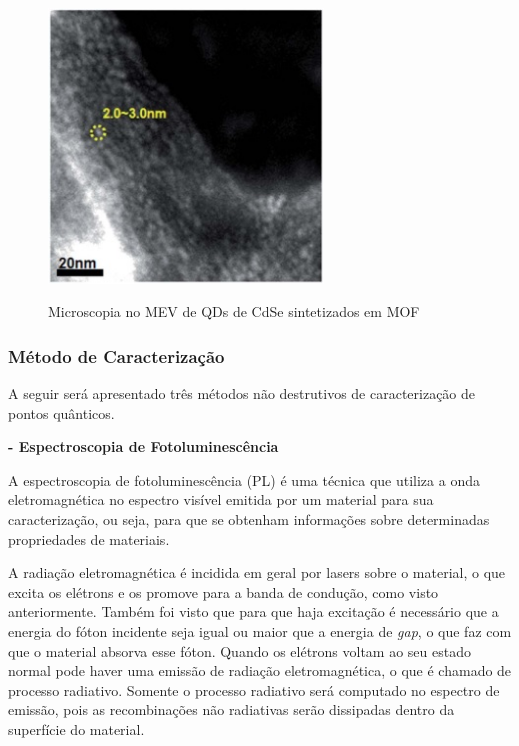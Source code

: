 	\begin{figure}[H]
	  \centering
	  \caption{Microscopia no MEV de QDs de CdSe sintetizados em MOF\cite{sintese3}}
	  \includegraphics[width=0.65\textwidth]{images/figura18.jpg}
	  \label{fig18}
	\end{figure}

\subsubsection{Método de Caracterização}

	\par A seguir será apresentado três métodos não destrutivos de caracterização de pontos quânticos.

	\par \textbf{- Espectroscopia de Fotoluminescência}

		\par A espectroscopia de fotoluminescência\cite{sintese4} (PL) é uma técnica que utiliza a onda eletromagnética no espectro visível emitida por um material para sua caracterização, ou seja, para que se obtenham informações sobre determinadas propriedades de materiais.

		\par A radiação eletromagnética é incidida em geral por lasers sobre o material, o que excita os elétrons e os promove para a banda de condução, como visto anteriormente. Também foi visto que para que haja excitação é necessário que a energia do fóton incidente seja igual ou maior que a energia de \textit{gap}, o que faz com que o material absorva esse fóton. Quando os elétrons voltam ao seu estado normal pode haver uma emissão de radiação eletromagnética, o que é chamado de processo radiativo. Somente o processo radiativo será computado no espectro de emissão, pois as recombinações não radiativas serão dissipadas dentro da superfície do material\cite{sintese4}.

